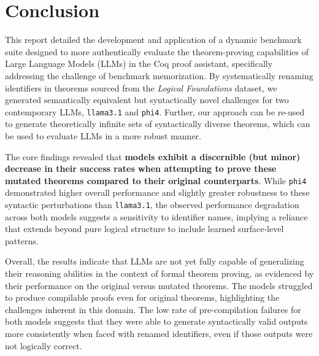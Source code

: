 
\section{Conclusion}
\label{sec:conclusion}
This report detailed the development and application of a dynamic benchmark suite designed to more authentically evaluate the theorem-proving capabilities of Large Language Models (LLMs) in the Coq proof assistant, specifically addressing the challenge of benchmark memorization. 
By systematically renaming identifiers in theorems sourced from the \emph{Logical Foundations} dataset, we generated semantically equivalent but syntactically novel challenges for two contemporary LLMs, \texttt{llama3.1} and \texttt{phi4}. Further, our approach can be re-used to generate theoretically infinite sets of syntactically diverse theorems, which can be used to evaluate LLMs in a more robust manner.

The core findings revealed that \textbf{models exhibit a discernible (but minor) decrease in their success rates when attempting to prove these mutated theorems compared to their original counterparts}. While \texttt{phi4} demonstrated higher overall performance and slightly greater robustness to these syntactic perturbations than \texttt{llama3.1}, the observed performance degradation across both models suggests a sensitivity to identifier names, implying a reliance that extends beyond pure logical structure to include learned surface-level patterns.

Overall, the results indicate that LLMs are not yet fully capable of generalizing their reasoning abilities in the context of formal theorem proving, as evidenced by their performance on the original versus mutated theorems. The models struggled to produce compilable proofs even for original theorems, highlighting the challenges inherent in this domain. The low rate of pre-compilation failures for both models suggests that they were able to generate syntactically valid outputs more consistently when faced with renamed identifiers, even if those outputs were not logically correct.